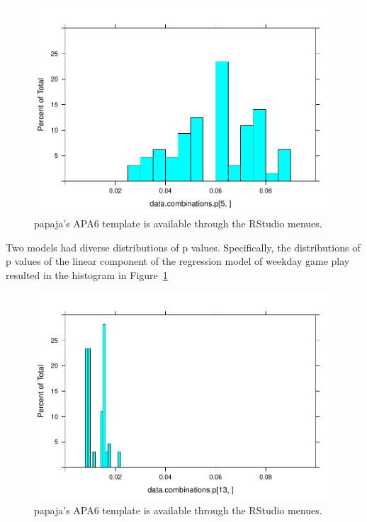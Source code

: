 \documentclass[floatsintext,man]{apa6}
\theoremstyle{definition}
\theoremstyle{definition}
\theoremstyle{definition}
\theoremstyle{remark}
\begin{document}
\begin{figure}

{\centering \includegraphics{stats_6_report_semifinal-3_files/figure-latex/Histdatadriven1-1} 

}

\caption{papaja's APA6 template is available through the RStudio menues.}\label{fig:Histdatadriven1}
\end{figure}

Two models had diverse distributions of p values. Specifically, the
distributions of p values of the linear component of the regression
model of weekday game play resulted in the histogram in
Figure~\ref{fig:Histdatadriven1}

\begin{figure}

{\centering \includegraphics{stats_6_report_semifinal-3_files/figure-latex/Histdatadriven2-1} 

}

\caption{papaja's APA6 template is available through the RStudio menues.}\label{fig:Histdatadriven2}
\end{figure}
\end{document}
